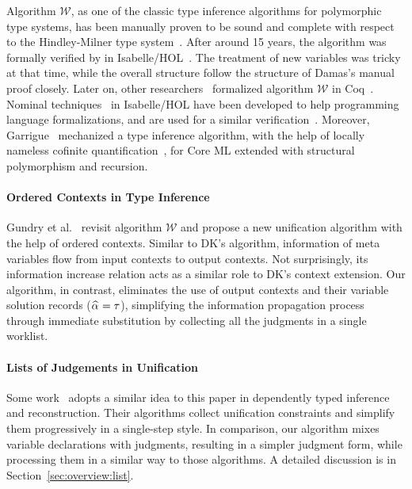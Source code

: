 Algorithm $\mathcal{W}$,
as one of the classic type inference algorithms for polymorphic type systems,
has been manually proven to be sound and complete
with respect to the Hindley-Milner type system~\cite{}.
After around 15 years, the algorithm was formally verified by
\citet{naraschewski1999type} in Isabelle/HOL~\cite{nipkow2002isabelle}.
The treatment of new variables was tricky at that time, while the overall structure follow the
structure of Damas's manual proof closely.
Later on, other researchers~\cite{dubois2000proving,dubois1999certification}
formalized algorithm $\mathcal{W}$ in Coq~\cite{Coq}.
Nominal techniques~\cite{urban2008nominalTech} in Isabelle/HOL have been
developed to help programming language formalizations, and are used for a similar
verification~\cite{urban2008nominal}. Moreover, Garrigue~\cite{garrigue2015certified}
mechanized a type inference algorithm,
with the help of locally nameless cofinite quantification~\cite{},
for Core ML extended with structural polymorphism and recursion.

\paragraph{Ordered Contexts in Type Inference}
Gundry et al.~\cite{gundry2010type} revisit algorithm $\mathcal{W}$ and
propose a new unification algorithm with the help of ordered contexts.
Similar to DK's algorithm, information of meta variables flow from input contexts to output contexts.
Not surprisingly, its information increase relation acts as a similar role to DK's context extension.
Our algorithm, in contrast,
eliminates the use of output contexts and their variable solution records ($\al = \tau$),
simplifying the information propagation process through immediate substitution
by collecting all the judgments in a single worklist.

\paragraph{Lists of Judgements in Unification}
Some work~\cite{Reed2009,Abel2011higher} adopts a similar idea to this paper
in dependently typed inference and reconstruction.
Their algorithms collect unification constraints and simplify them progressively in a single-step style.
In comparison, our algorithm mixes variable declarations with judgments,
resulting in a simpler judgment form,
while processing them in a similar way to those algorithms.
A detailed discussion is in Section~\ref{sec:overview:list}.


